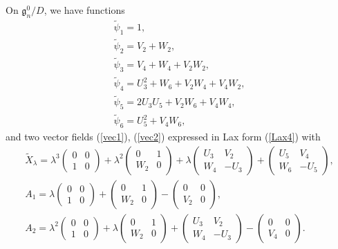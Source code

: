 \documentclass[pdftex]{sigma}
\numberwithin{equation}{section}
\begin{document}
On $\mathfrak{g}^0_n/D$, we have functions
\begin{gather*}
\widetilde{\psi}_1 = 1, \\
\widetilde{\psi}_2 = V_2+W_2, \\
\widetilde{\psi}_3 = V_4+W_4+V_2W_2, \\
\widetilde{\psi}_4 = U_3^2 + W_6 + V_2W_4 + V_4W_2, \\
\widetilde{\psi}_5 = 2U_3U_5 + V_2W_6 + V_4W_4, \\
\widetilde{\psi}_6 = U_5^2 + V_4W_6,
\end{gather*}
and two vector f\/ields (\ref{vec1}), (\ref{vec2}) expressed in Lax form (\ref{Lax4}) with
\begin{gather*}
\widetilde{X}_\lambda = \lambda ^3 \left(
\begin{matrix}
0 & 0 \\
1 & 0
\end{matrix}
\right) + \lambda^2 \left(
\begin{matrix}
0 & 1 \\
W_2 & 0
\end{matrix}
\right) + \lambda \left(
\begin{matrix}
U_3 & V_2 \\
W_4 & -U_3
\end{matrix}
\right) + \left(
\begin{matrix}
U_5 & V_4 \\
W_6 & -U_5
\end{matrix}
\right), \\
A_1 = \lambda \left(
\begin{matrix}
0 & 0 \\
1 & 0
\end{matrix}
\right) + \left(
\begin{matrix}
0 & 1 \\
W_2 & 0
\end{matrix}
\right) - \left(
\begin{matrix}
0 & 0 \\
V_2 & 0
\end{matrix}
\right), \\
A_2 = \lambda^2 \left(
\begin{matrix}
0 & 0 \\
1 & 0
\end{matrix}
\right) + \lambda \left(
\begin{matrix}
0 & 1 \\
W_2 & 0
\end{matrix}
\right) + \left(
\begin{matrix}
U_3 & V_2 \\
W_4 & -U_3
\end{matrix}
\right)
 - \left(
\begin{matrix}
0 & 0 \\
V_4 & 0
\end{matrix}
\right).
\end{gather*}
\end{document}
